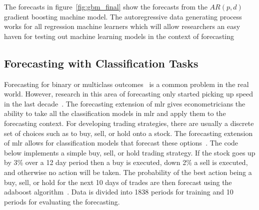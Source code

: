 \documentclass[12pt]{article}\usepackage[]{graphicx}\usepackage[]{color}
\theoremstyle{definition}
\newcommand{\pkg}[1]{{\fontseries{b}\selectfont #1}}
\begin{document}
The forecasts in figure~\ref{fig:gbm_final} show the forecasts from the $AR(p,d)$ gradient boosting machine model. The autoregressive data generating process works for all regression machine learners which will allow researchers an easy haven for testing out machine learning models in the context of forecasting


\subsection{Forecasting with Classification Tasks}

Forecasting for binary or multiclass outcomes~\cite{forecastBinary} is a common problem in the real world. However, research in this area of forecasting only started picking up speed in the last decade~\cite{ElliotBinary}. The forecasting extension of \pkg{mlr} gives econometricians the ability to take all the classification models in \pkg{mlr} and apply them to the forecasting context. For developing trading strategies, there are usually a discrete set of choices such as to buy, sell, or hold onto a stock. The forecasting extension of \pkg{mlr} allows for classification models that forecast these options~\cite{foreclassif}. The code below implements a simple buy, sell, or hold trading strategy. If the stock goes up by 3\% over a 12 day period then a buy is executed, down 2\% a sell is executed, and otherwise no action will be taken. The probability of the best action being a buy, sell, or hold for the next 10 days of trades are then forecast using the adaboost algorithm~\cite{adaboost}. Data is divided into 1838 periods for training and 10 periods for evaluating the forecasting.
\end{document}
